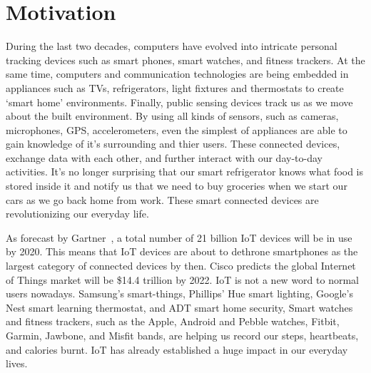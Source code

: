 \chapter{Motivation}\label{motivation}\label{chapter:Motivation}

During the last two decades, computers have evolved into intricate personal tracking devices such as smart phones, smart watches, and fitness trackers. At the same time, computers and communication technologies are being embedded in appliances such as TVs, refrigerators, light fixtures and thermostats to create `smart home' environments. Finally, public sensing devices track us as we move about the built environment. By using all kinds of sensors, such as cameras, microphones, GPS, accelerometers, even the simplest of appliances are able to gain knowledge of it's surrounding and thier users. These connected devices, exchange data with each other, and further interact with our day-to-day activities. It's no longer surprising that our smart refrigerator knows what food is stored inside it and notify us that we need to buy groceries when we start our cars as we go back home from work. These smart connected devices are revolutionizing our everyday life.


As forecast by Gartner~\cite{van_der_meulen_gartner_nodate}, a total number of 21 billion IoT devices will be in use by 2020. This means that IoT devices are about to dethrone smartphones as the largest category of connected devices by then. Cisco predicts the global Internet of Things market will be \$14.4 trillion by 2022.
IoT is not a new word to normal users nowadays. Samsung's smart-things, Phillips' Hue smart lighting, Google's Nest smart learning thermostat, and ADT smart home security, Smart watches and fitness trackers, such as the Apple, Android and Pebble watches, Fitbit, Garmin, Jawbone, and Misfit bands, are helping us record our steps, heartbeats, and calories burnt. IoT has already established a huge impact in our everyday lives. 


